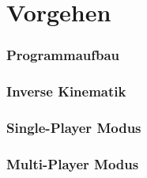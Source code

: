 \section{Vorgehen}

\begin{frame}
  \frametitle{Programmaufbau}
\end{frame}
 
\begin{frame}
  \frametitle{Inverse Kinematik}

\end{frame}

\begin{frame}
  \frametitle{Single-Player Modus}

\end{frame}

\begin{frame}
  \frametitle{Multi-Player Modus}

\end{frame}